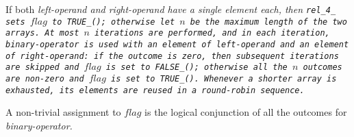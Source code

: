 If both \it{left-operand} and \it{right-operand} have a single
element each, then \tt{rel_4_} sets $flag$ to \tt{TRUE_()};
otherwise let $n$ be the maximum length of the two arrays.
At most $n$ iterations are performed, and in each iteration,
\it{binary-operator} is used with an element of \it{left-operand}
and an element of \it{right-operand}: if the outcome is zero,
then subsequent iterations are skipped and $flag$ is set to \tt{FALSE_()};
otherwise all the $n$ outcomes are non-zero and $flag$ is set to \tt{TRUE_()}.
Whenever a shorter array is exhausted,
its elements are reused in a round-robin sequence.

\note A non-trivial assignment to $flag$ is the logical
conjunction of all the outcomes for \it{binary-operator}.
